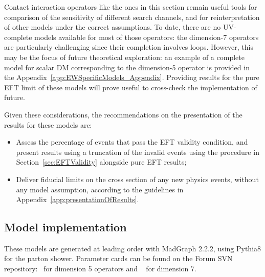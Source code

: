 Contact interaction operators like the ones in this section 
remain useful tools for comparison of the sensitivity of different search channels, 
and for reinterpretation of other models under the correct assumptions. 
To date, there are no UV-complete models available for most of those operators:
the dimension-7 operators are particularly challenging since their completion involves loops.
However, this may be the focus of future theoretical exploration: 
an example of a complete model 
for scalar DM corresponding to the dimension-5 operator 
is provided in the Appendix~\ref{app:EWSpecificModels_Appendix}. 
Providing results for the pure EFT limit of these models will prove useful
to cross-check the implementation of future. 

Given these considerations, the recommendations on the presentation of the results
for these models are: 

\begin{itemize}
\item Assess the percentage of events that pass the EFT validity condition, and present results using a truncation of the invalid events using the procedure in Section~\ref{sec:EFTValidity} alongside pure EFT results;
\item Deliver fiducial limits on the cross section of any new physics events, without any model assumption, according to the guidelines in Appendix~\ref{app:presentationOfResults}.  
\end{itemize}

\subsection{Model implementation}

These models are generated at leading
order with MadGraph 2.2.2, using Pythia8 for the parton shower.
Parameter cards can be found on the Forum SVN repository:~\cite{ForumSVN_EWEFTD7} for dimension 5 operators
and ~\cite{ForumSVN_EWEFTD7} for dimension 7.
